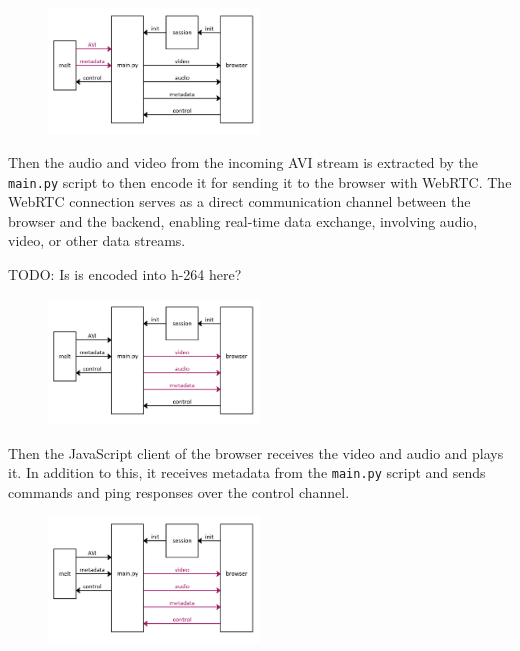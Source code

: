 \documentclass[12pt,a4paper]{article}
\begin{document}
\begin{figure}[H]
	\centering
	\includegraphics[width=0.5\textwidth]{IM_avi.png}
\end{figure}


Then the audio and video from the incoming AVI stream is extracted by the \texttt{main.py} script to then encode it for sending it to the browser with WebRTC. The WebRTC connection serves as a direct communication channel between the browser and the backend, enabling real-time data exchange, involving audio, video, or other data streams. 

TODO: Is is encoded into h-264 here?

%

\begin{figure}[H]
	\centering
	\includegraphics[width=0.5\textwidth]{IM_wrtc.png}
\end{figure}

Then the JavaScript client of the browser receives the video and audio and plays it. In addition to this, it
receives metadata from the \texttt{main.py} script and sends commands and ping responses over the control channel.


\begin{figure}[H]
	\centering
	\includegraphics[width=0.5\textwidth]{IM_wrtc_control.png}
\end{figure}
\end{document}
